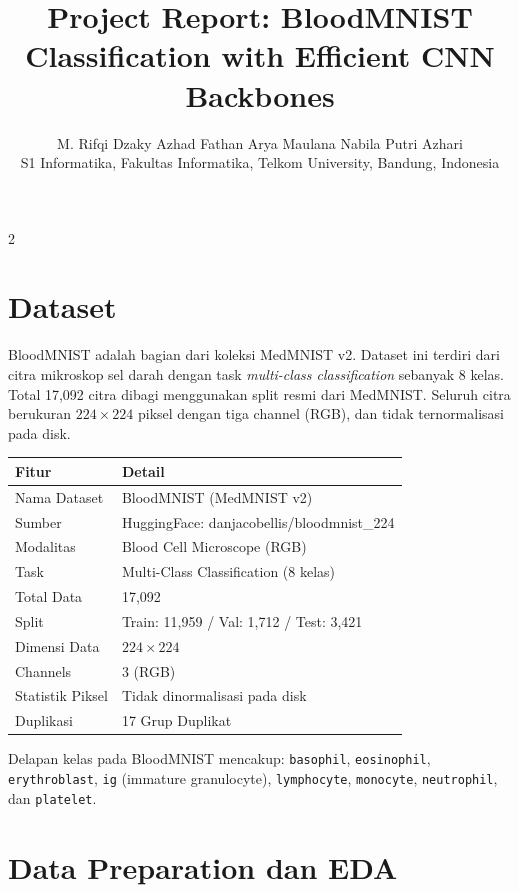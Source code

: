\documentclass[10pt]{article}
\title{\textbf{Project Report: BloodMNIST Classification with Efficient CNN Backbones}}
\author{
  M. Rifqi Dzaky Azhad \quad Fathan Arya Maulana \quad Nabila Putri Azhari\\
  S1 Informatika, Fakultas Informatika, Telkom University, Bandung, Indonesia
}
\date{}
\begin{document}
\maketitle
\begin{multicols}{2}

\section{Dataset}

BloodMNIST adalah bagian dari koleksi MedMNIST v2. Dataset ini terdiri dari citra mikroskop sel darah dengan task \textit{multi-class classification} sebanyak 8 kelas. Total 17,092 citra dibagi menggunakan split resmi dari MedMNIST. Seluruh citra berukuran $224 \times 224$ piksel dengan tiga channel (RGB), dan tidak ternormalisasi pada disk.

\begin{center}
\small
\begin{tabular}{lp{4.5cm}}
\toprule
\textbf{Fitur} & \textbf{Detail} \\
\midrule
Nama Dataset     & BloodMNIST (MedMNIST v2) \\
Sumber           & HuggingFace: danjacobellis/bloodmnist\_224 \\
Modalitas        & Blood Cell Microscope (RGB) \\
Task             & Multi-Class Classification (8 kelas) \\
Total Data       & 17,092 \\
Split            & Train: 11,959 / Val: 1,712 / Test: 3,421 \\
Dimensi Data     & $224 \times 224$ \\
Channels         & 3 (RGB) \\
Statistik Piksel & Tidak dinormalisasi pada disk \\
Duplikasi        & 17 Grup Duplikat \\
\bottomrule
\end{tabular}
\end{center}

Delapan kelas pada BloodMNIST mencakup: \texttt{basophil}, \texttt{eosinophil}, \texttt{erythroblast}, \texttt{ig} (immature granulocyte), \texttt{lymphocyte}, \texttt{monocyte}, \texttt{neutrophil}, dan \texttt{platelet}.

\section{Data Preparation dan EDA}


\end{multicols}
\end{document}
